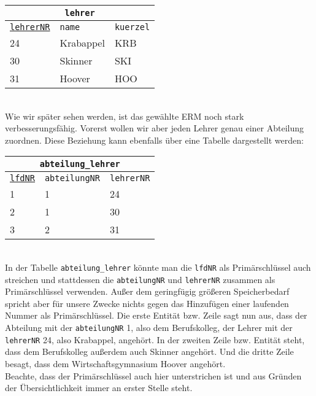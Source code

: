 \begin{tabular}{lll}
	\multicolumn{3}{c}{\lstinline!lehrer!}\\
	\hline
	\underline{\lstinline!lehrerNR!}&\lstinline!name!&\lstinline!kuerzel!\\
	\hline
	24&Krabappel&KRB\\
	30&Skinner&SKI\\
	31&Hoover&HOO\\
\end{tabular}\\
Wie wir später sehen werden, ist das gewählte ERM noch stark verbesserungsfähig. Vorerst wollen wir aber jeden Lehrer genau einer Abteilung zuordnen. Diese Beziehung kann ebenfalls über eine Tabelle dargestellt werden:\\
\begin{tabular}{lll}
	\multicolumn{3}{c}{\lstinline!abteilung_lehrer!}\\
	\hline
	\underline{\lstinline!lfdNR!}&\lstinline!abteilungNR!&\lstinline!lehrerNR!\\
	\hline
	1&1&24\\
	2&1&30\\
	3&2&31\\
\end{tabular}\\
In der Tabelle \lstinline!abteilung_lehrer! könnte man die \lstinline!lfdNR! als Primärschlüssel auch streichen und stattdessen die \lstinline!abteilungNR! und \lstinline!lehrerNR! zusammen als Primärschlüssel verwenden. Außer dem geringfügig größeren Speicherbedarf spricht aber für unsere Zwecke nichts gegen das Hinzufügen einer laufenden Nummer als Primärschlüssel. Die erste Entität bzw. Zeile sagt nun aus, dass der Abteilung mit der \lstinline!abteilungNR! 1, also dem Berufskolleg, der Lehrer mit der \lstinline!lehrerNR! 24, also Krabappel, angehört. In der zweiten Zeile bzw. Entität steht, dass dem Berufskolleg außerdem auch Skinner angehört. Und die dritte Zeile besagt, dass dem Wirtschaftsgymnasium Hoover angehört.\\
Beachte, dass der Primärschlüssel auch hier unterstrichen ist und aus Gründen der Übersichtlichkeit immer an erster Stelle steht.
\begin{Exercise}[title=Erstelle zu den ERMs aus Aufgabe \ref{ERMErstellen1} passende Tabellen., label=TabelleErstellen1]

\end{Exercise}
